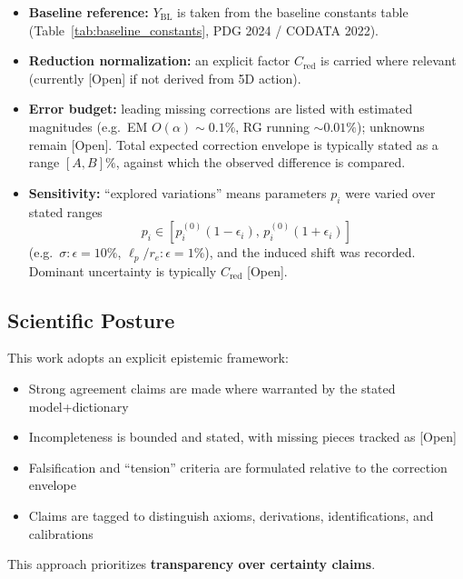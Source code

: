 \begin{itemize}
\item \textbf{Baseline reference:} $Y_{\mathrm{BL}}$ is taken from the baseline constants table 
(Table~\ref{tab:baseline_constants}, PDG 2024 / CODATA 2022).

\item \textbf{Reduction normalization:} an explicit factor $C_{\mathrm{red}}$ is carried where 
relevant (currently [Open] if not derived from 5D action).

\item \textbf{Error budget:} leading missing corrections are listed with estimated magnitudes 
(e.g.\ EM $O(\alpha) \sim 0.1\%$, RG running $\sim 0.01\%$); unknowns remain [Open]. 
Total expected correction envelope is typically stated as a range $[A, B]\%$, against which 
the observed difference is compared.

\item \textbf{Sensitivity:} ``explored variations'' means parameters $p_i$ were varied over 
stated ranges
\[
p_i \in [p_i^{(0)}(1-\epsilon_i),\, p_i^{(0)}(1+\epsilon_i)]
\]
(e.g.\ $\sigma: \epsilon = 10\%$, $\ell_p/r_e: \epsilon = 1\%$), and the induced shift 
was recorded. Dominant uncertainty is typically $C_{\mathrm{red}}$ [Open].
\end{itemize}


\subsection*{Scientific Posture}

This work adopts an explicit epistemic framework:
\begin{itemize}
\item Strong agreement claims are made where warranted by the stated model+dictionary
\item Incompleteness is bounded and stated, with missing pieces tracked as [Open]
\item Falsification and ``tension'' criteria are formulated relative to the correction envelope
\item Claims are tagged to distinguish axioms, derivations, identifications, and calibrations
\end{itemize}

This approach prioritizes \textbf{transparency over certainty claims}.

